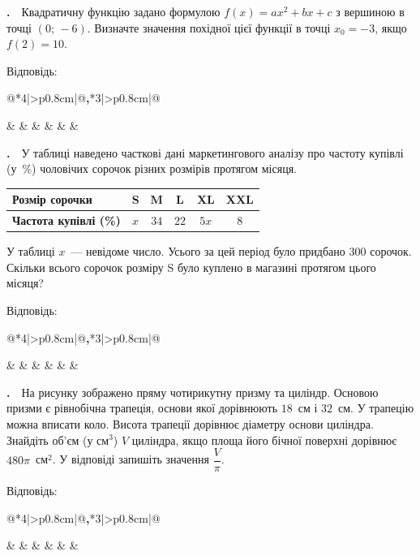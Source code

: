 \documentclass[12pt]{article}
\makeatletter
\newcommand{\nmtAnswerBox}{%
\par\vspace{0.2cm}\noindent
Відповідь:\ \ 
\begin{tabular}{@{}*{4}{|>{\centering\arraybackslash}p{0.8cm}}|@{\hspace{0.1cm}\textbf{,}\hspace{0.1cm}}*{3}{|>{\centering\arraybackslash}p{0.8cm}}|@{}}
\hline
\rule[-0.2cm]{0pt}{0.7cm} & & & & & & \\
\hline
\end{tabular}
\par\vspace{0.3cm}}
\newcounter{zad}
\newcommand{\zadtask}[1]{\stepcounter{zad}\par\vspace{0.3cm}\noindent\textbf{\thezad.}\ \ #1\par\vspace{0.2cm}}
\newcommand{\zadnum}{\stepcounter{zad}\noindent\textbf{\thezad.}\ \ }
\makeatother
\begin{document}
\zadtask{Квадратичну функцію задано формулою $f(x) = ax^2 + bx + c$ з вершиною в точці $(0;\, -6)$. Визначте значення похідної цієї функції в точці $x_0 = -3$, якщо $f(2) = 10$.}
\nmtAnswerBox

\zadtask{У таблиці наведено часткові дані маркетингового аналізу про частоту купівлі (у~\%) чоловічих сорочок різних розмірів протягом місяця.
\vspace{0.2cm}

\noindent\begin{center}
\renewcommand{\arraystretch}{1.3}
\begin{tabular}{|>{\raggedright\arraybackslash}m{3.6cm}|c|c|c|c|c|}
\hline
\textbf{Розмір сорочки} & S & M & L & XL & XXL \\
\hline
\textbf{Частота купівлі (\%)} & $x$ & $34$ & $22$ & $5x$ & $8$ \\
\hline
\end{tabular}
\end{center}
\vspace{0.2cm}

У таблиці $x$~--- невідоме число. Усього за цей період було придбано $300$ сорочок. Скільки всього сорочок розміру S було куплено в магазині протягом цього місяця?}
\nmtAnswerBox

\noindent
\begin{minipage}[c]{0.56\textwidth}
\zadnum На рисунку зображено пряму чотирикутну призму та циліндр. Основою призми є рівнобічна трапеція, основи якої дорівнюють $18$~см і $32$~см. У трапецію можна вписати коло. Висота трапеції дорівнює діаметру основи циліндра. Знайдіть об'єм (у см$^3$) $V$ циліндра, якщо площа його бічної поверхні дорівнює $480\pi$~см$^2$. У відповіді запишіть значення $\dfrac{V}{\pi}$.
\end{minipage}%
\hfill
\begin{minipage}[c]{0.42\textwidth}
\centering
{}
\end{minipage}
\par\vspace{0.2cm}
\nmtAnswerBox
\end{document}
